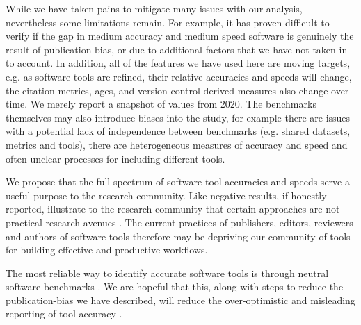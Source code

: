 \documentclass[fleqn,10pt]{SelfArx} %
\begin{document}
While we have taken pains to mitigate many issues with our analysis, nevertheless 
some limitations remain. For example, it has proven difficult to verify if the gap in medium accuracy 
and medium speed software is genuinely the result of publication bias, or due to additional factors that we have 
not taken in to account. In addition, all of the features we have used here are moving targets, e.g. as software 
tools are refined, their relative accuracies and speeds will change, the citation metrics, ages, and version control 
derived measures also change over time. We merely report a snapshot of values from 2020.  The benchmarks themselves may 
also introduce biases into the study, for example there are issues with a potential lack of independence between benchmarks 
(e.g. shared datasets, metrics and tools), there are heterogeneous measures of accuracy and speed and often unclear 
processes for including different tools. 



We propose that the full spectrum of software tool accuracies and
speeds serve a useful purpose to the research community. Like negative
results, if honestly reported, illustrate to the research community
that certain approaches are not practical research avenues
\cite{fanelli2012negative}. %
The current
practices of publishers, editors, reviewers and authors of software
tools therefore may be depriving our community of tools for building effective
and productive workflows.

The most reliable way to identify accurate software tools is through neutral
software benchmarks \cite{Boulesteix2013-vb}. We are hopeful that
this, along with steps to reduce the publication-bias we have
described, will reduce the over-optimistic and misleading reporting of
tool accuracy \cite{Boulesteix2010-te,Jelizarow2010-zf,Norel2011-cq}.
\end{document}
